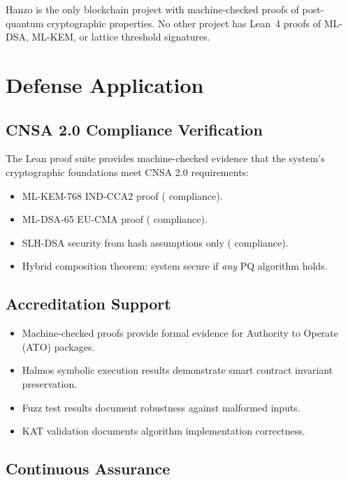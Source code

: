 \documentclass[11pt,letterpaper]{article}
\begin{document}
Hanzo is the only blockchain project with machine-checked proofs of post-quantum cryptographic properties. No other project has Lean~4 proofs of ML-DSA, ML-KEM, or lattice threshold signatures.

\section{Defense Application}

\subsection{CNSA 2.0 Compliance Verification}

The Lean proof suite provides machine-checked evidence that the system's cryptographic foundations meet CNSA 2.0 requirements:

\begin{itemize}
\item ML-KEM-768 IND-CCA2 proof ( compliance).
\item ML-DSA-65 EU-CMA proof ( compliance).
\item SLH-DSA security from hash assumptions only ( compliance).
\item Hybrid composition theorem: system secure if \emph{any} PQ algorithm holds.
\end{itemize}

\subsection{Accreditation Support}

\begin{itemize}
\item Machine-checked proofs provide formal evidence for Authority to Operate (ATO) packages.
\item Halmos symbolic execution results demonstrate smart contract invariant preservation.
\item Fuzz test results document robustness against malformed inputs.
\item KAT validation documents algorithm implementation correctness.
\end{itemize}

\subsection{Continuous Assurance}
\end{document}
